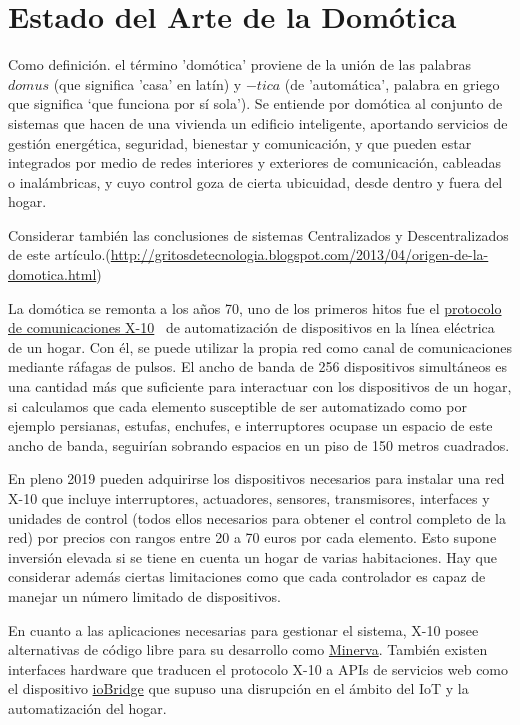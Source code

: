 \cleardoublepage

\chapter{Estado del Arte de la Domótica}
\label{ch:Capitulo2}

Como definición. el término 'domótica' proviene de la unión de las palabras $domus$ (que significa 'casa' en latín) y $-tica$ (de 'automática', palabra en griego que significa ‘que funciona por sí sola’). Se entiende por domótica al conjunto de sistemas que hacen de una vivienda un edificio inteligente, aportando servicios de gestión energética, seguridad, bienestar y comunicación, y que pueden estar integrados por medio de redes interiores y exteriores de comunicación, cableadas o inalámbricas, y cuyo control goza de cierta ubicuidad, desde dentro y fuera del hogar.


Considerar también las conclusiones de sistemas Centralizados y Descentralizados de este artículo.(\url{http://gritosdetecnologia.blogspot.com/2013/04/origen-de-la-domotica.html})

La domótica se remonta a los años 70, uno de los primeros hitos fue el \href{https://es.wikipedia.org/wiki/X10}{protocolo de comunicaciones X-10}~\cite{x10protocolwikipedia} de automatización de dispositivos en la línea eléctrica de un hogar. Con él, se puede utilizar la propia red como canal de comunicaciones mediante ráfagas de pulsos. El ancho de banda de 256 dispositivos simultáneos es una cantidad más que suficiente para interactuar con los dispositivos de un hogar, si calculamos que cada elemento susceptible de ser automatizado como por ejemplo persianas, estufas, enchufes, e interruptores ocupase un espacio de este ancho de banda, seguirían sobrando espacios en un piso de 150 metros cuadrados.

En pleno 2019 pueden adquirirse los dispositivos necesarios para instalar una red X-10 que incluye interruptores, actuadores, sensores, transmisores, interfaces y unidades de control (todos ellos necesarios para obtener el control completo de la red) por precios con rangos entre 20 a 70 euros por cada elemento. Esto supone inversión elevada si se tiene en cuenta un hogar de varias habitaciones. Hay que considerar además ciertas limitaciones como que cada controlador es capaz de manejar un número limitado de dispositivos.

En cuanto a las aplicaciones necesarias para gestionar el sistema, X-10 posee alternativas de código libre para su desarrollo como \href{http://www.minervahome.net/}{Minerva}. También existen interfaces hardware que traducen el protocolo X-10 a APIs de servicios web como el dispositivo \href{http://www.iobridge.com/}{ioBridge} que supuso una disrupción en el ámbito del IoT y la automatización del hogar.

